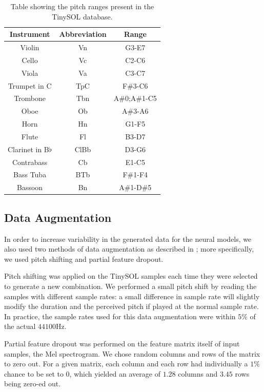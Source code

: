 \documentclass[runningheads,a4paper]{llncs}
\begin{document}
 
\begin{table}
\begin{center}
	\caption{Table showing the pitch ranges present in the TinySOL database.\label{tab:ranges}}
	\begin{tabular}{|c|c|c|}
	\hline
	\textbf{Instrument} & \textbf{Abbreviation} & \textbf{Range} \\
	\hline
	Violin & Vn & G3-E7\\
	Cello & Vc & C2-C6\\
	Viola & Va & C3-C7\\
	Trumpet in C & TpC & F\#3-C6\\
	Trombone & Tbn & A\#0;A\#1-C5\\
	Oboe & Ob & A\#3-A6\\
	Horn & Hn & G1-F5\\
	Flute & Fl & B3-D7\\
	Clarinet in B$\flat$ & ClBb & D3-G6\\
	Contrabass & Cb & E1-C5\\
	Bass Tuba & BTb & F\#1-F4\\
	Bassoon & Bn & A\#1-D\#5\\
	\hline
	\end{tabular}
\end{center}
\end{table}

\subsection{Data Augmentation}

In order to increase variability in the generated data for the neural models, we also used two methods of data augmentation as described in \cite{Salamon17, Bhardwaj17}; more specifically, we used pitch shifting and partial feature dropout.

Pitch shifting was applied on the TinySOL samples each time they were selected to generate a new combination. We performed a small pitch shift by reading the samples with different sample rates: a small difference in sample rate will slightly modify the duration and the perceived pitch if played at the normal sample rate. In practice, the sample rates used for this data augmentation were within $5\%$ of the actual $44100$Hz.

Partial feature dropout was performed on the feature matrix itself of input samples, the Mel spectrogram. We chose random columns and rows of the matrix to zero out. For a given matrix, each column and each row had individually a $1\%$ chance to be set to 0, which yielded an average of $1.28$  columns and $3.45$ rows being zero-ed out.
\end{document}
